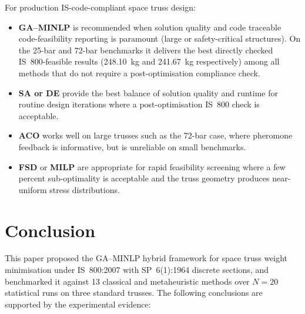 \documentclass[lineno,pdflatex,sn-mathphys-num]{sn-jnl}
\begin{document}
For production IS-code-compliant space truss design:
\begin{itemize}
  \item \textbf{GA--MINLP} is recommended when solution quality and code
        traceable code-feasibility reporting is paramount (large or safety-critical structures).
        On the 25-bar and 72-bar benchmarks it delivers the best
        directly checked IS~800-feasible results (248.10~kg and 241.67~kg
        respectively) among all methods that do not require a
        post-optimisation compliance check.
  \item \textbf{SA or DE} provide the best balance of solution quality
        and runtime for routine design iterations where a
        post-optimisation IS~800 check is acceptable.
  \item \textbf{ACO} works well on large trusses such as the 72-bar
        case, where pheromone feedback is informative, but is unreliable
        on small benchmarks.
  \item \textbf{FSD} or \textbf{MILP} are appropriate for rapid
        feasibility screening where a few percent sub-optimality is
        acceptable and the truss geometry produces near-uniform stress
        distributions.
\end{itemize}


\section{Conclusion}
\label{sec:conclusion}

This paper proposed the GA--MINLP hybrid framework for space truss
weight minimisation under IS~800:2007 with SP~6(1):1964 discrete
sections, and benchmarked it against 13 classical and metaheuristic
methods over $N=20$ statistical runs on three standard trusses.
The following conclusions are supported by the experimental evidence:
\end{document}
